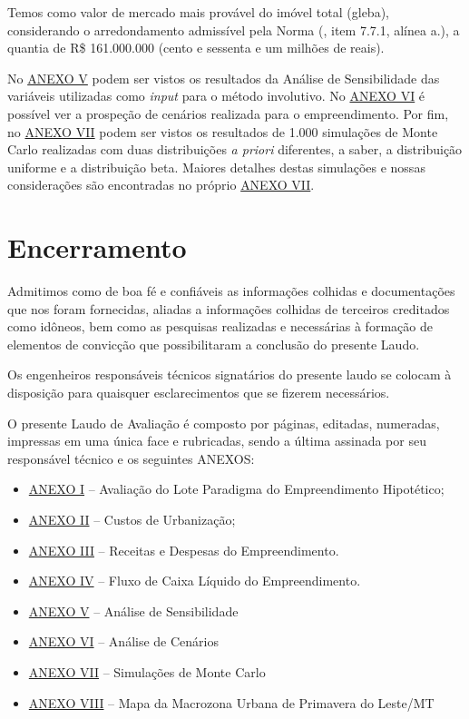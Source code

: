 \documentclass[
  10pt,
  a4paper]{article}
\providecommand{\tightlist}{%
  \setlength{\itemsep}{0pt}\setlength{\parskip}{0pt}}
\begin{document}
Temos como valor de mercado mais provável do imóvel total (gleba),
considerando o arredondamento admissível pela Norma
(, item 7.7.1, alínea a.), a
quantia de R\$ 161.000.000 (cento e sessenta e um milhões de reais).

No \hyperref[anexo-v]{ANEXO V} podem ser vistos os resultados da Análise
de Sensibilidade das variáveis utilizadas como \emph{input} para o
método involutivo. No \hyperref[anexo-vi]{ANEXO VI} é possível ver a
prospeção de cenários realizada para o empreendimento. Por fim, no
\hyperref[anexo-vii]{ANEXO VII} podem ser vistos os resultados de 1.000
simulações de Monte Carlo realizadas com duas distribuições \emph{a
priori} diferentes, a saber, a distribuição uniforme e a distribuição
beta. Maiores detalhes destas simulações e nossas considerações são
encontradas no próprio \hyperref[anexo-vii]{ANEXO VII}.

\section{Encerramento}\label{encerramento}

Admitimos como de boa fé e confiáveis as informações colhidas e
documentações que nos foram fornecidas, aliadas a informações colhidas
de terceiros creditados como idôneos, bem como as pesquisas realizadas e
necessárias à formação de elementos de convicção que possibilitaram a
conclusão do presente Laudo.

Os engenheiros responsáveis técnicos signatários do presente laudo se
colocam à disposição para quaisquer esclarecimentos que se fizerem
necessários.

O presente Laudo de Avaliação é composto por \pageref{LastPage} páginas,
editadas, numeradas, impressas em uma única face e rubricadas, sendo a
última assinada por seu responsável técnico e os seguintes ANEXOS:

\begin{itemize}
\tightlist
\item
  \hyperref[anexo-i]{ANEXO I} -- Avaliação do Lote Paradigma do
  Empreendimento Hipotético;
\item
  \hyperref[anexo-ii]{ANEXO II} -- Custos de Urbanização;
\item
  \hyperref[anexo-iii]{ANEXO III} -- Receitas e Despesas do
  Empreendimento.
\item
  \hyperref[anexo-iv]{ANEXO IV} -- Fluxo de Caixa Líquido do
  Empreendimento.
\item
  \hyperref[anexo-v]{ANEXO V} -- Análise de Sensibilidade
\item
  \hyperref[anexo-vi]{ANEXO VI} -- Análise de Cenários
\item
  \hyperref[anexo-vii]{ANEXO VII} -- Simulações de Monte Carlo
\item
  \hyperref[anexo-viii]{ANEXO VIII} -- Mapa da Macrozona Urbana de
  Primavera do Leste/MT
\end{itemize}
\end{document}
